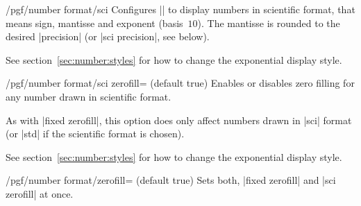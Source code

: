 \begin{key}{/pgf/number format/sci}
Configures |\pgfmathprintnumber| to display numbers in scientific format, that means sign, mantisse and exponent (basis~$10$). The mantisse is rounded to the desired |precision| (or |sci precision|, see below).

\begin{codeexample}[]
\hspace{1em}
\hspace{1em}
\hspace{1em}
\hspace{1em}
\end{codeexample}

See section~\ref{sec:number:styles} for how to change the exponential display style.
\end{key}

\begin{key}{/pgf/number format/sci zerofill=  (default true)}
Enables or disables zero filling for any number drawn in scientific format.

\begin{codeexample}[]
\hspace{1em}
\hspace{1em}
\hspace{1em}
\hspace{1em}
\end{codeexample}
As with |fixed zerofill|, this option does only affect numbers drawn in |sci| format (or |std| if the scientific format is chosen).

See section~\ref{sec:number:styles} for how to change the exponential display style.
\end{key}

\begin{stylekey}{/pgf/number format/zerofill= (default true)}
	Sets both, |fixed zerofill| and |sci zerofill| at once.
\end{stylekey}


